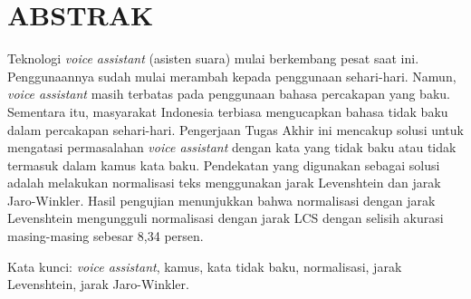 \clearpage
\chapter*{ABSTRAK}

Teknologi \textit{voice assistant} (asisten suara) mulai berkembang pesat saat ini. Penggunaannya sudah mulai merambah kepada penggunaan sehari-hari. Namun, \textit{voice assistant} masih terbatas pada penggunaan bahasa percakapan yang baku. Sementara itu, masyarakat Indonesia terbiasa mengucapkan bahasa tidak baku dalam percakapan sehari-hari. Pengerjaan Tugas Akhir ini mencakup solusi untuk mengatasi permasalahan \textit{voice assistant} dengan kata yang tidak baku atau tidak termasuk dalam kamus kata baku. Pendekatan yang digunakan sebagai solusi adalah melakukan normalisasi teks menggunakan jarak Levenshtein dan jarak Jaro-Winkler. Hasil pengujian menunjukkan bahwa normalisasi dengan jarak Levenshtein mengungguli normalisasi dengan jarak LCS dengan selisih akurasi masing-masing sebesar 8,34 persen.

\vspace{15mm}
Kata kunci: \textit{voice assistant}, kamus, kata tidak baku, normalisasi, jarak Levenshtein, jarak Jaro-Winkler.
\clearpage